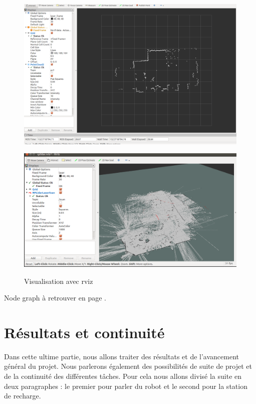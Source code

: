 \documentclass[french]{rapportENSTAB}
\begin{document}
\begin{figure}[h]
\centering
\begin{minipage}[b]{.5\textwidth}
  \centering
  \includegraphics[width=.95\linewidth]{images/robot/lidar.png}
  \label{fig:archi elec}
\end{minipage}%
%
\begin{minipage}[b]{.61\textwidth}
  \centering
  \includegraphics[width=.95\linewidth]{images/robot/lidarslam.png}
  \label{fig:archi elec}
\end{minipage}
%


\vspace{3mm}
\caption{Visualisation avec rviz}
\label{fig:archi elec}
\end{figure}


Node graph à retrouver en page \pageref{annexe5}.

\section{Résultats et continuité}
Dans cette ultime partie, nous allons traiter des résultats et de l'avancement général du projet. Nous parlerons également des possibilités de suite de projet et de la continuité des différentes tâches. Pour cela nous allons divisé la suite en deux paragraphes : le premier pour parler du robot et le second pour la station de recharge.\\
\end{document}

